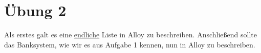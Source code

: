 \documentclass{fm}
\begin{document}
\section*{Übung 2}
Als erstes galt es eine \underline{endliche} Liste in Alloy zu beschreiben. Anschließend sollte das Banksystem, wie wir es aus Aufgabe 1 kennen, nun in Alloy zu beschreiben.
\end{document}
